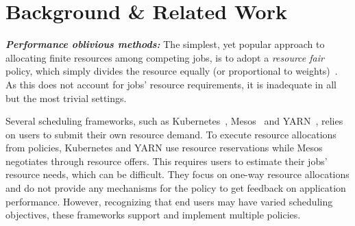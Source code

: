 

\insertTableRelatedWork{}

\section{Background \& Related Work}
\label{sec:related}


\newcommand{\relworkheading}[1]{\textbf{\textit{#1:}}}

\relworkheading{Performance oblivious methods}
The simplest, yet popular approach to allocating finite resources
among competing jobs, is to adopt a \emph{resource fair} policy,
which simply divides the resource equally
(or proportional to weights)~\cite{jiang2012improving,isard2009quincy,hadoopfs,mo2000fair}.
As this does not account for jobs'
resource requirements, it is inadequate in 
all but the most trivial settings.  




Several scheduling frameworks, such as Kubernetes~\cite{kubernetes},
Mesos~\cite{hindman2011mesos} and YARN~\cite{yarn},
relies on users to submit their own resource demand.
To execute resource allocations from policies,
Kubernetes and YARN use resource reservations while Mesos negotiates through
resource offers.
This requires users to estimate their jobs' resource needs, which can be difficult.
They focus on one-way resource allocations
and do not provide any mechanisms for the policy
to get feedback on application performance.
However,
recognizing that end users may have varied scheduling objectives,
these frameworks support and implement multiple policies.


